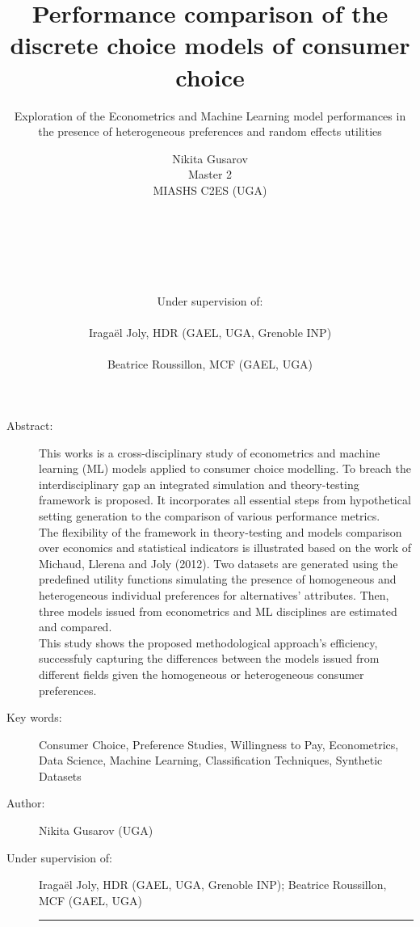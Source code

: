 \documentclass[12pt,]{article}
\title{Performance comparison of the discrete choice models of consumer choice}
\subtitle{Exploration of the Econometrics and Machine Learning model performances
in the presence of heterogeneous preferences and random effects
utilities}
\author{\large Nikita Gusarov\\
\normalsize Master 2\\
MIASHS C2ES (UGA)\\
~\\
~\\
\hspace{50mm}\\
~\\
~\\
\raggedright Under supervision of:\\
\raggedright\hspace{10mm} Iragaël Joly, HDR (GAEL, UGA, Grenoble INP)\\
\raggedright\hspace{10mm} Beatrice Roussillon, MCF (GAEL, UGA)\\
\hspace{-40mm}}
\date{}
\begin{document}
\maketitle

\begin{description}

\item[Abstract:] This works is a cross-disciplinary study of econometrics and machine learning (ML) models applied to consumer choice modelling. 
To breach the interdisciplinary gap an integrated simulation and theory-testing framework is proposed. 
It incorporates all essential steps from hypothetical setting generation to the comparison of various performance metrics. \vspace{0.1cm}\\ 
The flexibility of the framework in theory-testing and models comparison over economics and statistical indicators is illustrated based on the work of Michaud, Llerena and Joly (2012). 
Two datasets are generated using the predefined utility functions simulating the presence of homogeneous and heterogeneous individual preferences for alternatives' attributes. 
Then, three models issued from econometrics and ML disciplines are estimated and compared. \vspace{0.1cm}\\ 
This study shows the proposed methodological approach's efficiency, successfuly capturing the differences between the models issued from different fields given the homogeneous or heterogeneous consumer preferences. 

\item[Key words:] Consumer Choice, Preference Studies, Willingness to Pay, Econometrics, Data Science, Machine Learning, Classification Techniques, Synthetic Datasets

\item[Author:] Nikita Gusarov (UGA)

\item[Under supervision of:] Iragaël Joly, HDR (GAEL, UGA, Grenoble INP); Beatrice Roussillon, MCF (GAEL, UGA)

\vspace{0.5cm}
\hrule
\vspace{0.5cm}


\end{description}
\end{document}
